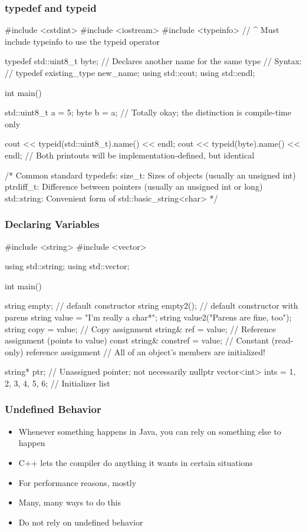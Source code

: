 \documentclass[glossy]{beamer}
\begin{document}
\begin{frame}[fragile=singleslide]
  \frametitle{typedef and typeid}
  \begin{cppcode}
#include <cstdint>
#include <iostream>
#include <typeinfo>
// ^ Must include typeinfo to use the typeid operator

typedef std::uint8_t byte; // Declares another name for the same type
// Syntax:
//    typedef existing_type new_name;
using std::cout;
using std::endl; 

int main() { 
  std::uint8_t a = 5; 
  byte b = a; 
  // Totally okay; the distinction is compile-time only 

  cout << typeid(std::uint8_t).name() << endl; 
  cout << typeid(byte).name() << endl; 
  // Both printouts will be implementation-defined, but identical 

  /* Common standard typedefs: 
        size_t: Sizes of objects (usually an unsigned int)
        ptrdiff_t: Difference between pointers (usually an unsigned int or long) 
        std::string: Convenient form of std::basic_string<char> 
  */ 
}
  \end{cppcode}
\end{frame}

\begin{frame}[fragile=singleslide]
  \frametitle{Declaring Variables}
  \begin{cppcode}
#include <string>
#include <vector>

using std::string;
using std::vector;

int main() {
  string empty; // default constructor
  string empty2(); // default constructor with parens
  string value = "I'm really a char*";
  string value2("Parens are fine, too");
  string copy = value; // Copy assignment
  string& ref = value; // Reference assignment (points to value)
  const string& constref = value; // Constant (read-only) reference assignment
  // All of an object's members are initialized!

  string* ptr; // Unassigned pointer; not necessarily nullptr
  vector<int> ints = {1, 2, 3, 4, 5, 6}; // Initializer list
}
  \end{cppcode}
\end{frame}

\begin{frame}[fragile=singleslide]
  \frametitle{Undefined Behavior}
  \begin{itemize}
    \item Whenever something happens in Java, you can rely on something else to happen
    \item C++ lets the compiler do anything it wants in certain situations
    \item For performance reasons, mostly
    \item Many, many ways to do this
    \item Do not rely on undefined behavior
  \end{itemize}
\end{frame}
\end{document}
